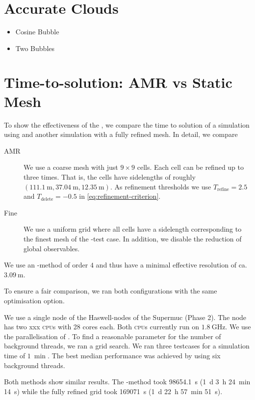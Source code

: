 \section{Accurate Clouds}
\begin{itemize}
\item Cosine Bubble
\item Two Bubbles
\end{itemize}
\section{Time-to-solution: AMR vs Static Mesh}
To show the effectiveness of the \amr{}, we compare the time to solution of a simulation using \amr{} and another simulation with a fully refined mesh.
In detail, we compare
\begin{description}
\item[AMR] We use a coarse mesh with just $9 \times 9$ cells.
  Each cell can be refined up to three times.
  That is, the cells have sidelengths of roughly $\left( \SI{111.1}{\m}, \SI{37.04}{\m}, \SI{12.35}{\m} \right)$.
  As refinement thresholds we use $T_\text{refine} = 2.5$ and $T_\text{delete} = -0.5$ in \cref{eq:refinement-criterion}.
\item[Fine] We use a uniform grid where all cells have a sidelength corresponding to the finest mesh of the \amr{}-test case.
  In addition, we disable the reduction of global observables.
\end{description}
We use an \aderdg{}-method of order $4$ and thus have a minimal effective resolution of ca.\ $\SI{3.09}{\m}$.

To ensure a fair comparison, we ran both configurations with the same optimisation option.

We use a single node of the Haswell-nodes of the Supermuc (Phase 2).
The node has two xxx \textsc{cpu}s with 28 cores each.
Both \textsc{cpu}s currently run on $\SI{1.8}{\GHz}$.
We use the \tbb{} parallelisation of \exahype{}.
To find a reasonable parameter for the number of background threads, we ran a grid search.
We ran three \amr{} testcases for a simulation time of $\SI{1}{\min}$.
The best median performance was achieved by using six background threads.

Both methods show similar results.
The \amr{}-method took \SI{98654.1}{\s} (\SI{1}{\day} \SI{3}{\hour} \SI{24}{\minute} \SI{14}{\s})
while the fully refined grid took \SI{169071}{\s} (\SI{1}{\day} \SI{22}{\hour} \SI{57}{\minute} \SI{51}{\s}).

